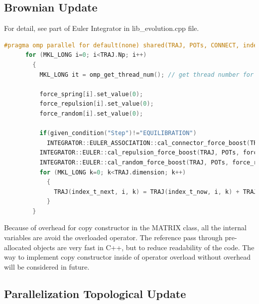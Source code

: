 \documentclass[10pt, a4paper]{article}
\begin{document}
\begin{appendices}
  
  \section{Brownian Update}
  For detail, see part of Euler Integrator in lib{\_}evolution.cpp file.
  \begin{lstlisting}[language=C++,frame=single]
    #pragma omp parallel for default(none) shared(TRAJ, POTs, CONNECT, index_t_now, index_t_next, R_minimum_vec_boost, R_minimum_distance_boost, vec_boost_Nd_parallel, force_spring, force_repulsion, force_random, r_boost_arr, N_THREADS_BD, given_condition) num_threads(N_THREADS_BD) if(N_THREADS_BD > 1)
      for (MKL_LONG i=0; i<TRAJ.Np; i++)
        {
          MKL_LONG it = omp_get_thread_num(); // get thread number for shared array objects
          
          force_spring[i].set_value(0);
          force_repulsion[i].set_value(0);
          force_random[i].set_value(0);

          if(given_condition("Step")!="EQUILIBRATION")
            INTEGRATOR::EULER_ASSOCIATION::cal_connector_force_boost(TRAJ, POTs, CONNECT, force_spring[i], index_t_now, i, R_minimum_vec_boost, R_minimum_distance_boost);
          INTEGRATOR::EULER::cal_repulsion_force_boost(TRAJ, POTs, force_repulsion[i], index_t_now, i, R_minimum_vec_boost, R_minimum_distance_boost);
          INTEGRATOR::EULER::cal_random_force_boost(TRAJ, POTs, force_random[i], index_t_now, r_boost_arr[it]);
          for (MKL_LONG k=0; k<TRAJ.dimension; k++)
            {
              TRAJ(index_t_next, i, k) = TRAJ(index_t_now, i, k) + TRAJ.dt*((1./POTs.force_variables[0])*force_spring[i](k) + force_repulsion[i](k)) + sqrt(TRAJ.dt)*force_random[i](k);
            }
        }
  \end{lstlisting}

  Because of overhead for copy constructor in the MATRIX class, all the internal variables are avoid the overloaded operator. The reference pass through pre-allocated objects are very fast in C++, but to reduce readability of the code. The way to implement copy constructor inside of operator overload without overhead will be considered in future.

  \subsection{Parallelization Topological Update}

\end{appendices}
\end{document}
